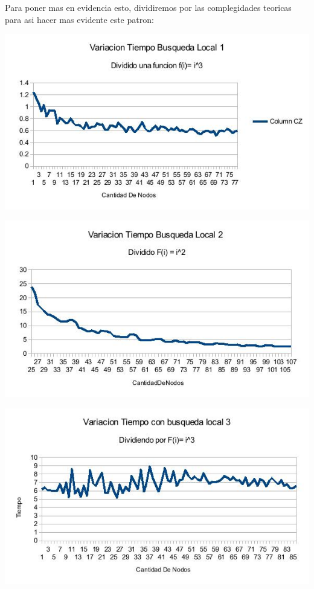 Para poner mas en evidencia esto, dividiremos por las complegidades teoricas para asi hacer mas evidente este patron:

\includegraphics[scale=0.5]{Ej4/tiempo1div.jpg}

\includegraphics[scale=0.5]{Ej4/tiempo2div.jpg}

\includegraphics[scale=0.5]{Ej4/tiempo3div.jpg}

